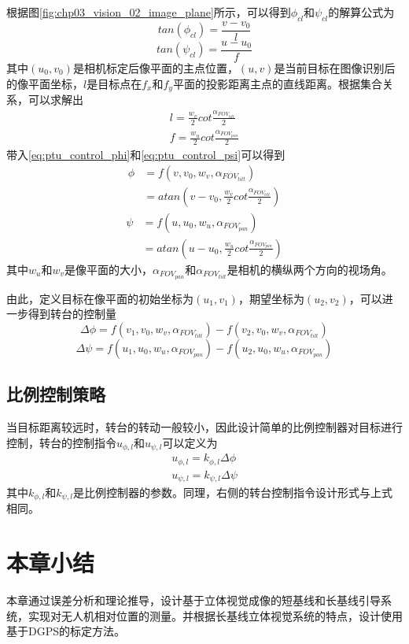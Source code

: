 根据图\ref{fig:chp03_vision_02_image_plane}所示，可以得到$\phi_{cl}$和$\psi_{cl}$的解算公式为
\begin{equation}
\label{eq:ptu_control_phi}
tan(\phi_{cl})=\frac{v-v_0}{l}
\end{equation}
\begin{equation}
\label{eq:ptu_control_psi}
tan(\psi_{cl})=\frac{u-u_0}{f}
\end{equation}
其中$(u_0, v_0)$是相机标定后像平面的主点位置，$(u, v)$是当前目标在图像识别后的像平面坐标，$l$是目标点在$f_x$和$f_y$平面的投影距离主点的直线距离。根据集合关系，可以求解出
\begin{align}
l = \frac{w_v}{2}cot \frac{\alpha_{FOV_{tilt}}}{2} \\
f = \frac{w_u}{2}cot\frac{\alpha_{FOV_{pan}}}{2}
\end{align}
带入\ref{eq:ptu_control_phi}和\ref{eq:ptu_control_psi}可以得到
\begin{align} \label{eq:FOV_TILT}
\phi &=f(v, v_0, w_v, \alpha_{FOV_{tilt}}) \\
&=atan(v-v_0, \frac{w_v}{2}cot \frac{\alpha_{FOV_{tilt}}}{2})
\end{align}
\begin{align} \label{eq:FOV_PAN}
\psi &=f(u, u_0, w_u, \alpha_{FOV_{pan}}) \\
&=atan(u-u_0, \frac{w_u}{2}cot\frac{\alpha_{FOV_{pan}}}{2})
\end{align}
其中$w_u$和$w_v$是像平面的大小，$\alpha_{FOV_{pan}}$和$\alpha_{FOV_{tilt}}$是相机的横纵两个方向的视场角。

由此，定义目标在像平面的初始坐标为$(u_1, v_1)$，期望坐标为$(u_2, v_2)$，可以进一步得到转台的控制量
\begin{equation}
\Delta\phi=f(v_1,v_0,w_v, \alpha_{FOV_{tilt}})-f(v_2,v_0, w_v, \alpha_{FOV_{tilt}})
\end{equation}
\begin{equation}
\Delta\psi=f(u_1,u_0,w_u, \alpha_{FOV_{pan}})-f(u_2,u_0, w_u, \alpha_{FOV_{pan}})
\end{equation}

\subsection{比例控制策略}
当目标距离较远时，转台的转动一般较小，因此设计简单的比例控制器对目标进行控制，转台的控制指令$u_{\phi,l}$和$u_{\psi,l}$可以定义为
\begin{align}
u_{\phi,l} = k_{\phi,l}\Delta\phi\\
u_{\psi,l} = k_{\psi,l}\Delta\psi
\end{align}
其中$k_{\phi,l}$和$k_{\psi,l}$是比例控制器的参数。同理，右侧的转台控制指令设计形式与上式相同。



\section{本章小结}
本章通过误差分析和理论推导，设计基于立体视觉成像的短基线和长基线引导系统，实现对无人机相对位置的测量。并根据长基线立体视觉系统的特点，设计使用基于DGPS的标定方法。
